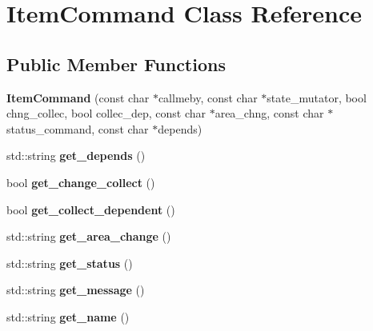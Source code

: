 \hypertarget{class_item_command}{
\section{ItemCommand Class Reference}
\label{class_item_command}
}
\subsection*{Public Member Functions}
\begin{DoxyCompactItemize}
\item 
\hypertarget{class_item_command_a3ceac49250c95e48015f649e088e8650}{
{\bfseries ItemCommand} (const char $\ast$callmeby, const char $\ast$state\_\-mutator, bool chng\_\-collec, bool collec\_\-dep, const char $\ast$area\_\-chng, const char $\ast$status\_\-command, const char $\ast$depends)}
\label{class_item_command_a3ceac49250c95e48015f649e088e8650}

\item 
\hypertarget{class_item_command_aab2f239abd8e51eed941a7144c5a20f0}{
std::string {\bfseries get\_\-depends} ()}
\label{class_item_command_aab2f239abd8e51eed941a7144c5a20f0}

\item 
\hypertarget{class_item_command_a076738abba7d76c8b5e28f42e11b6df5}{
bool {\bfseries get\_\-change\_\-collect} ()}
\label{class_item_command_a076738abba7d76c8b5e28f42e11b6df5}

\item 
\hypertarget{class_item_command_a478d2e1a02ea0b44e41e3d15e59e2156}{
bool {\bfseries get\_\-collect\_\-dependent} ()}
\label{class_item_command_a478d2e1a02ea0b44e41e3d15e59e2156}

\item 
\hypertarget{class_item_command_ac40efb86e5eab9229d2c343b308b6fa5}{
std::string {\bfseries get\_\-area\_\-change} ()}
\label{class_item_command_ac40efb86e5eab9229d2c343b308b6fa5}

\item 
\hypertarget{class_item_command_ad0a8c59554e3d4a7a14299fd7df8dc70}{
std::string {\bfseries get\_\-status} ()}
\label{class_item_command_ad0a8c59554e3d4a7a14299fd7df8dc70}

\item 
\hypertarget{class_item_command_a81079b514b0785ce9c86f8618f096c18}{
std::string {\bfseries get\_\-message} ()}
\label{class_item_command_a81079b514b0785ce9c86f8618f096c18}

\item 
\hypertarget{class_item_command_ad19f0634b23480fcae2f05ee1a0f13f1}{
std::string {\bfseries get\_\-name} ()}
\label{class_item_command_ad19f0634b23480fcae2f05ee1a0f13f1}


\end{DoxyCompactItemize}
